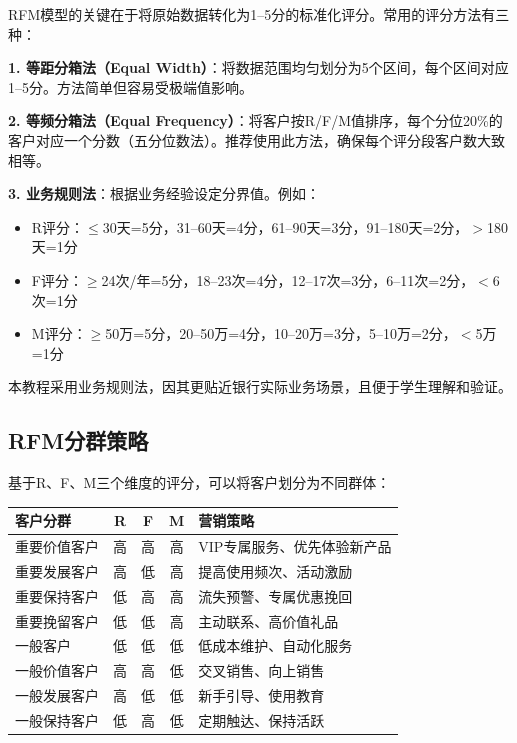 \begin{theorybox}[RFM评分标准的设定方法]
RFM模型的关键在于将原始数据转化为1--5分的标准化评分。常用的评分方法有三种：

\textbf{1. 等距分箱法（Equal Width）}：将数据范围均匀划分为5个区间，每个区间对应1--5分。方法简单但容易受极端值影响。

\textbf{2. 等频分箱法（Equal Frequency）}：将客户按R/F/M值排序，每个分位20\%的客户对应一个分数（五分位数法）。推荐使用此方法，确保每个评分段客户数大致相等。

\textbf{3. 业务规则法}：根据业务经验设定分界值。例如：
\begin{itemize}[leftmargin=1em]
  \item R评分：$\leq$30天=5分，31--60天=4分，61--90天=3分，91--180天=2分，$>$180天=1分
  \item F评分：$\geq$24次/年=5分，18--23次=4分，12--17次=3分，6--11次=2分，$<$6次=1分
  \item M评分：$\geq$50万=5分，20--50万=4分，10--20万=3分，5--10万=2分，$<$5万=1分
\end{itemize}

本教程采用业务规则法，因其更贴近银行实际业务场景，且便于学生理解和验证。
\end{theorybox}

\subsection{RFM分群策略}

基于R、F、M三个维度的评分，可以将客户划分为不同群体：

\begin{table}[H]
\centering
\begin{tabular}{lcccl}
\toprule
\textbf{客户分群} & \textbf{R} & \textbf{F} & \textbf{M} & \textbf{营销策略} \\
\midrule
重要价值客户 & 高 & 高 & 高 & VIP专属服务、优先体验新产品 \\
重要发展客户 & 高 & 低 & 高 & 提高使用频次、活动激励 \\
重要保持客户 & 低 & 高 & 高 & 流失预警、专属优惠挽回 \\
重要挽留客户 & 低 & 低 & 高 & 主动联系、高价值礼品 \\
一般客户 & 低 & 低 & 低 & 低成本维护、自动化服务 \\
一般价值客户 & 高 & 高 & 低 & 交叉销售、向上销售 \\
一般发展客户 & 高 & 低 & 低 & 新手引导、使用教育 \\
一般保持客户 & 低 & 高 & 低 & 定期触达、保持活跃 \\
\bottomrule
\end{tabular}
\end{table}

